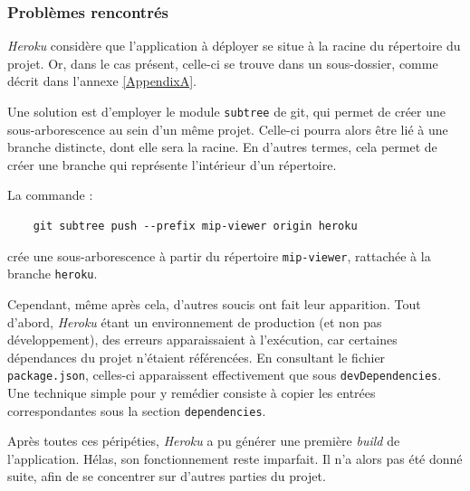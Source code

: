 \subsubsection{Problèmes rencontrés}

\textit{Heroku} considère que l'application à déployer se situe à la racine du répertoire du projet. Or, dans le cas présent, celle-ci se trouve dans un sous-dossier, comme décrit dans l'annexe \ref{AppendixA}.

Une solution est d'employer le module \texttt{subtree} de git, qui permet de créer une sous-arborescence au sein d'un même projet. Celle-ci pourra alors être lié à une branche distincte, dont elle sera la racine. En d'autres termes, cela permet de créer une branche qui représente l'intérieur d'un répertoire.

La commande :
\begin{verbatim}
    git subtree push --prefix mip-viewer origin heroku
\end{verbatim}

crée une sous-arborescence à partir du répertoire \texttt{mip-viewer}, rattachée à la branche \texttt{heroku}.

Cependant, même après cela, d'autres soucis ont fait leur apparition. 
Tout d'abord, \textit{Heroku} étant un environnement de production (et non pas développement), des erreurs apparaissaient à l'exécution, car certaines dépendances du projet n'étaient référencées. En consultant le fichier \texttt{package.json}, celles-ci apparaissent effectivement que sous \texttt{devDependencies}. Une technique simple pour y remédier consiste à copier les entrées correspondantes sous la section \texttt{dependencies}.

Après toutes ces péripéties, \textit{Heroku} a pu générer une première \textit{build}  de l'application. Hélas, son fonctionnement reste imparfait. Il n'a alors pas été donné suite, afin de se concentrer sur d'autres parties du projet.